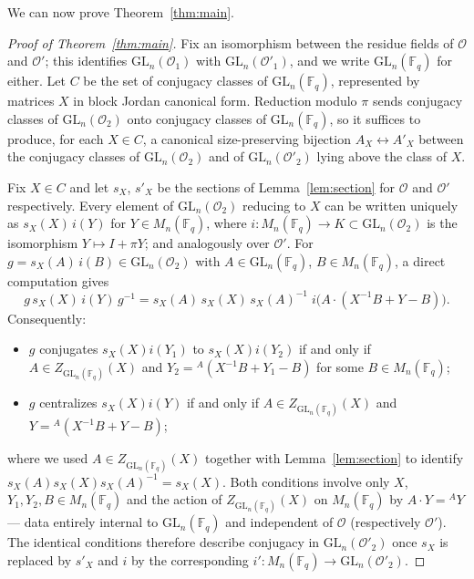 \documentclass[11pt]{amsart}
\theoremstyle{definition}
\newcommand{\GL}{\mathrm{GL}}
\newcommand{\Fq}{\mathbb{F}_q}
\begin{document}
	We can now prove Theorem~\ref{thm:main}.
	
	\begin{proof}[Proof of Theorem~\ref{thm:main}]
		Fix an isomorphism between the residue fields of $\mathcal O$ and
		$\mathcal O'$; this identifies $\GL_n(\mathcal O_1)$ with
		$\GL_n(\mathcal O'_1)$, and we write $\GL_n(\Fq)$ for either. Let $C$ be
		the set of conjugacy classes of $\GL_n(\Fq)$, represented by matrices $X$
		in block Jordan canonical form. Reduction modulo $\pi$ sends conjugacy
		classes of $\GL_n(\mathcal O_2)$ onto conjugacy classes of $\GL_n(\Fq)$, so
		it suffices to produce, for each $X\in C$, a canonical size-preserving
		bijection $A_X\leftrightarrow A'_X$ between the conjugacy classes of
		$\GL_n(\mathcal O_2)$ and of $\GL_n(\mathcal O'_2)$ lying above the class
		of $X$.
		
		Fix $X\in C$ and let $s_X$, $s'_X$ be the sections of
		Lemma~\ref{lem:section} for $\mathcal O$ and $\mathcal O'$ respectively.
		Every element of $\GL_n(\mathcal O_2)$ reducing to $X$ can be written
		uniquely as $s_X(X)\,i(Y)$ for $Y\in M_n(\Fq)$, where
		$i:M_n(\Fq)\to K\subset \GL_n(\mathcal O_2)$ is the isomorphism $Y\mapsto
		I+\pi Y$; and analogously over $\mathcal O'$. For $g=s_X(A)\,i(B)\in
		\GL_n(\mathcal O_2)$ with $A\in\GL_n(\Fq)$, $B\in M_n(\Fq)$, a direct
		computation gives
		\[
		g\,s_X(X)\,i(Y)\,g^{-1}
		= s_X(A)\,s_X(X)\,s_X(A)^{-1}\; i\bigl(A\cdot(X^{-1}B+Y-B)\bigr).
		\]
		Consequently:
		\begin{itemize}
			\item $g$ conjugates $s_X(X)i(Y_1)$ to $s_X(X)i(Y_2)$ if and only if
			$A\in Z_{\GL_n(\Fq)}(X)$ and $Y_2 = {}^A(X^{-1}B+Y_1-B)$ for some
			$B\in M_n(\Fq)$;
			\item $g$ centralizes $s_X(X)i(Y)$ if and only if $A\in
			Z_{\GL_n(\Fq)}(X)$ and $Y={}^A(X^{-1}B+Y-B)$;
		\end{itemize}
		where we used $A\in Z_{\GL_n(\Fq)}(X)$ together with Lemma~\ref{lem:section}
		to identify $s_X(A)s_X(X)s_X(A)^{-1}=s_X(X)$. Both conditions involve only
		$X$, $Y_1,Y_2,B\in M_n(\Fq)$ and the action of $Z_{\GL_n(\Fq)}(X)$ on
		$M_n(\Fq)$ by $A\cdot Y = {}^AY$ — data entirely internal to $\GL_n(\Fq)$
		and independent of $\mathcal O$ (respectively $\mathcal O'$). The identical
		conditions therefore describe conjugacy in $\GL_n(\mathcal O'_2)$ once
		$s_X$ is replaced by $s'_X$ and $i$ by the corresponding $i':M_n(\Fq)\to
		\GL_n(\mathcal O'_2)$.
		

\end{proof}
\end{document}
